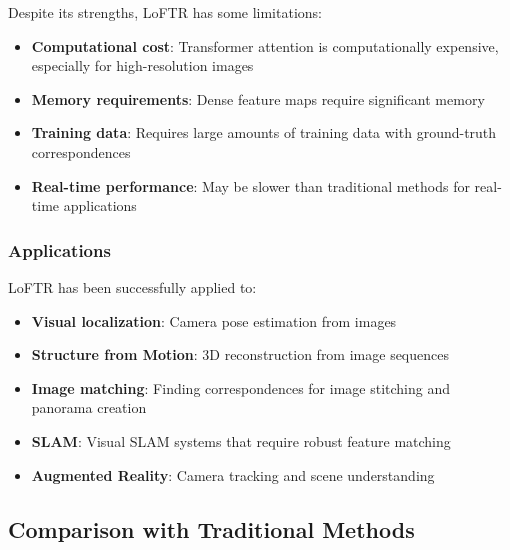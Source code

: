 \documentclass[11pt,a4paper]{article}
\theoremstyle{definition}
\theoremstyle{plain}
\theoremstyle{remark}
\begin{document}
Despite its strengths, LoFTR has some limitations:
\begin{itemize}
    \item \textbf{Computational cost}: Transformer attention is computationally expensive, especially for high-resolution images
    \item \textbf{Memory requirements}: Dense feature maps require significant memory
    \item \textbf{Training data}: Requires large amounts of training data with ground-truth correspondences
    \item \textbf{Real-time performance}: May be slower than traditional methods for real-time applications
\end{itemize}

\subsubsection{Applications}

LoFTR has been successfully applied to:
\begin{itemize}
    \item \textbf{Visual localization}: Camera pose estimation from images
    \item \textbf{Structure from Motion}: 3D reconstruction from image sequences
    \item \textbf{Image matching}: Finding correspondences for image stitching and panorama creation
    \item \textbf{SLAM}: Visual SLAM systems that require robust feature matching
    \item \textbf{Augmented Reality}: Camera tracking and scene understanding
\end{itemize}


\subsection{Comparison with Traditional Methods}
\end{document}
